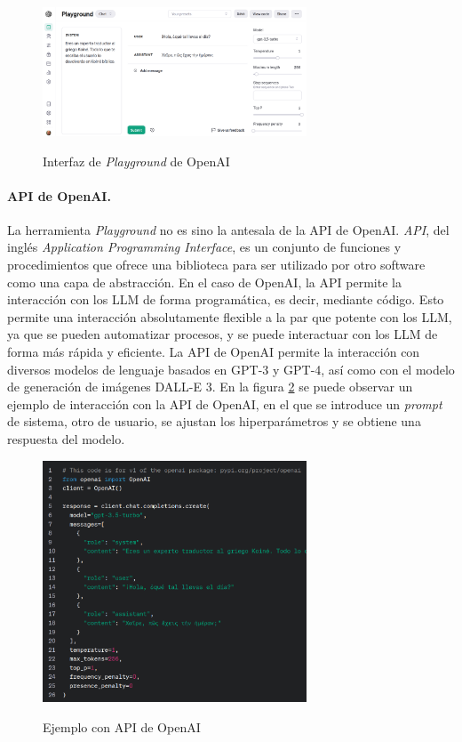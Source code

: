         \begin{figure}[h]
            \caption[Interfaz de \textit{Playground} de OpenAI]{Interfaz de \textit{Playground} de OpenAI}
            \centering
            \includegraphics[width=0.7\textwidth]{./figuras/interfaz_playground.png}
            \label{fig:playground}
        \end{figure}

        \paragraph{API de OpenAI.} La herramienta \textit{Playground} no es sino la antesala de la API de OpenAI. \textit{API}, del inglés \textit{Application Programming Interface}, es un conjunto de funciones y procedimientos que ofrece una biblioteca para ser utilizado por otro software como una capa de abstracción. En el caso de OpenAI, la API permite la interacción con los LLM de forma programática, es decir, mediante código. Esto permite una interacción absolutamente flexible a la par que potente con los LLM, ya que se pueden automatizar procesos, y se puede interactuar con los LLM de forma más rápida y eficiente. La API de OpenAI permite la interacción con diversos modelos de lenguaje basados en GPT-3 y GPT-4, así como con el modelo de generación de imágenes DALL-E 3. En la figura \ref{fig:api} se puede observar un ejemplo de interacción con la API de OpenAI, en el que se introduce un \textit{prompt} de sistema, otro de usuario, se ajustan los hiperparámetros y se obtiene una respuesta del modelo.

        \begin{figure}[h]
            \caption[Ejemplo con API de OpenAI]{Ejemplo con API de OpenAI}
            \centering
            \includegraphics[width=0.7\textwidth]{./figuras/ejemplo_API.png}
            \label{fig:api}
        \end{figure}

